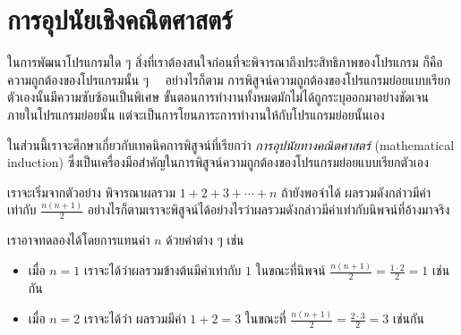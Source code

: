 \section{การ{\wbr}อุปนัย{\wbr}เชิง{\wbr}คณิตศาสตร์}

ใน{\wbr}การ{\wbr}พัฒนา{\wbr}โปรแกรม{\wbr}ใด ๆ สิ่ง{\wbr}ที่{\wbr}เรา{\wbr}ต้อง{\wbr}สนใจ{\wbr}ก่อน{\wbr}ที่{\wbr}จะ{\wbr}พิจารณา{\wbr}ถึง{\wbr}ประสิทธิภาพ{\wbr}ของ{\wbr}โปรแกรม{\wbr}
ก็{\wbr}คือ{\wbr}ความ{\wbr}ถูกต้อง{\wbr}ของ{\wbr}โปรแกรม{\wbr}นั้น ๆ \ \ อย่างไรก็ตาม{\wbr}
การ{\wbr}พิสูจน์{\wbr}ความ{\wbr}ถูกต้อง{\wbr}ของ{\wbr}โปรแกรมย่อย{\wbr}แบบ{\wbr}เรียก{\wbr}ตัวเอง{\wbr}นั้น{\wbr}มี{\wbr}ความ{\wbr}ซับซ้อน{\wbr}เป็นพิเศษ{\wbr}
ขั้นตอน{\wbr}การ{\wbr}ทำงาน{\wbr}ทั้งหมด{\wbr}มัก{\wbr}ไม่{\wbr}ได้{\wbr}ถูก{\wbr}ระบุ{\wbr}ออก{\wbr}มา{\wbr}อย่าง{\wbr}ชัดเจน{\wbr}ภายใน{\wbr}โปรแกรมย่อย{\wbr}นั้น{\wbr}
แต่{\wbr}จะ{\wbr}เป็น{\wbr}การ{\wbr}โยน{\wbr}ภาระ{\wbr}การ{\wbr}ทำงาน{\wbr}ให้{\wbr}กับ{\wbr}โปรแกรมย่อย{\wbr}นั้น{\wbr}เอง{\wbr}

ใน{\wbr}ส่วน{\wbr}นี้{\wbr}เรา{\wbr}จะ{\wbr}ศึกษา{\wbr}เกี่ยวกับ{\wbr}เทคนิค{\wbr}การ{\wbr}พิสูจน์{\wbr}ที่{\wbr}เรียก{\wbr}ว่า {\em การ{\wbr}อุปนัย{\wbr}ทาง{\wbr}คณิตศาสตร์}
(mathematical induction)
ซึ่ง{\wbr}เป็น{\wbr}เครื่องมือ{\wbr}สำคัญ{\wbr}ใน{\wbr}การ{\wbr}พิสูจน์{\wbr}ความ{\wbr}ถูกต้อง{\wbr}ของ{\wbr}โปรแกรมย่อย{\wbr}แบบ{\wbr}เรียก{\wbr}ตัวเอง{\wbr}

เรา{\wbr}จะ{\wbr}เริ่ม{\wbr}จาก{\wbr}ตัวอย่าง พิจารณา{\wbr}ผลรวม $1+2+3+\cdots+n$ ถ้า{\wbr}ยัง{\wbr}พอ{\wbr}จำ{\wbr}ได้{\wbr}
ผลรวม{\wbr}ดังกล่าว{\wbr}มี{\wbr}ค่า{\wbr}เท่า{\wbr}กับ $\frac{n(n+1)}{2}$
อย่างไรก็ตาม{\wbr}เรา{\wbr}จะ{\wbr}พิสูจน์{\wbr}ได้{\wbr}อย่างไร{\wbr}ว่า{\wbr}ผลรวม{\wbr}ดังกล่าว{\wbr}มี{\wbr}ค่า{\wbr}เท่า{\wbr}กับ{\wbr}นิพจน์{\wbr}ที่{\wbr}อ้าง{\wbr}มา{\wbr}จริง{\wbr}

เรา{\wbr}อาจ{\wbr}ทดลอง{\wbr}ได้{\wbr}โดย{\wbr}การ{\wbr}แทน{\wbr}ค่า $ n $ ด้วย{\wbr}ค่า{\wbr}ต่าง ๆ เช่น{\wbr}

\begin{itemize}
\item เมื่อ $ n=1 $ เรา{\wbr}จะ{\wbr}ได้{\wbr}ว่า{\wbr}ผลรวม{\wbr}ข้างต้น{\wbr}มี{\wbr}ค่า{\wbr}เท่า{\wbr}กับ $ 1 $ ใน{\wbr}ขณะที่{\wbr}นิพจน์ $
  \frac{n(n+1)}{2}=\frac{1\cdot 2}{2}=1 $ เช่นกัน{\wbr}
\item เมื่อ $ n=2 $ เรา{\wbr}จะ{\wbr}ได้{\wbr}ว่า ผลรวม{\wbr}มี{\wbr}ค่า $ 1+2=3 $ ใน{\wbr}ขณะที่ $
  \frac{n(n+1)}{2}=\frac{2\cdot 3}{2}=3 $ เช่นกัน{\wbr}
\end{itemize}


